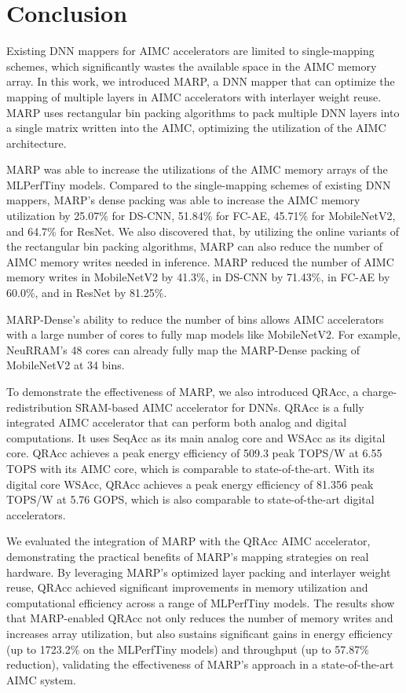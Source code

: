 \section{Conclusion}

Existing DNN mappers for AIMC accelerators are limited to single-mapping schemes, which significantly wastes the available space in the AIMC memory array. In this work, we introduced MARP, a DNN mapper that can optimize the mapping of multiple layers in AIMC accelerators with interlayer weight reuse. MARP uses rectangular bin packing algorithms to pack multiple DNN layers into a single matrix written into the AIMC, optimizing the utilization of the AIMC architecture.

MARP was able to increase the utilizations of the AIMC memory arrays of the MLPerfTiny models. Compared to the single-mapping schemes of existing DNN mappers, MARP's dense packing was able to increase the AIMC memory utilization by 25.07\% for DS-CNN, 51.84\% for FC-AE, 45.71\% for MobileNetV2, and 64.7\% for ResNet. 
We also discovered that, by utilizing the online variants of the rectangular bin packing algorithms, MARP can also reduce the number of AIMC memory writes needed in inference. MARP reduced the number of AIMC memory writes in MobileNetV2 by 41.3\%, in DS-CNN by 71.43\%, in FC-AE by 60.0\%, and in ResNet by 81.25\%.

MARP-Dense's ability to reduce the number of bins allows AIMC accelerators with a large number of cores to fully map models like MobileNetV2. For example, NeuRRAM's 48 cores can already fully map the MARP-Dense packing of MobileNetV2 at 34 bins. 

To demonstrate the effectiveness of MARP, we also introduced QRAcc, a charge-redistribution SRAM-based AIMC accelerator for DNNs. QRAcc is a fully integrated AIMC accelerator that can perform both analog and digital computations. It uses SeqAcc as its main analog core and WSAcc as its digital core. QRAcc achieves a peak energy efficiency of 509.3 peak TOPS/W at 6.55 TOPS with its AIMC core, which is comparable to state-of-the-art. With its digital core WSAcc, QRAcc achieves a peak energy efficiency of 81.356 peak TOPS/W at 5.76 GOPS, which is also comparable to state-of-the-art digital accelerators.

We evaluated the integration of MARP with the QRAcc AIMC accelerator, demonstrating the practical benefits of MARP’s mapping strategies on real hardware. By leveraging MARP’s optimized layer packing and interlayer weight reuse, QRAcc achieved significant improvements in memory utilization and computational efficiency across a range of MLPerfTiny models. The results show that MARP-enabled QRAcc not only reduces the number of memory writes and increases array utilization, but also sustains significant gains in energy efficiency (up to 1723.2\% on the MLPerfTiny models) and throughput (up to 57.87\% reduction), validating the effectiveness of MARP’s approach in a state-of-the-art AIMC system.

